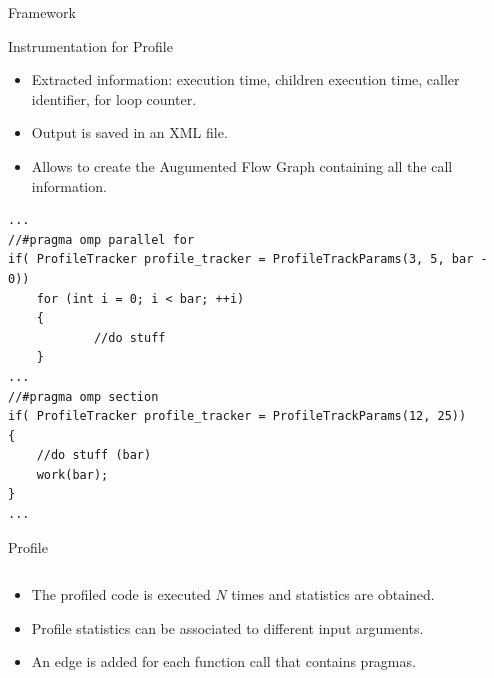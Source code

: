 \documentclass[xcolor=dvipsnames]{beamer}
\begin{document}
\begin{section}{Framework}
\begin{frame}[fragile]{\hskip 0.3cm Instrumentation for Profile}
\begin{itemize}
\item Extracted information: execution time, children execution time, caller identifier, for loop counter.

\item Output is saved in an XML file.

\item Allows to create the Augumented Flow Graph containing all the call information.

\end{itemize}


\begin{lstlisting}[language=CCC]
...
//#pragma omp parallel for
if( ProfileTracker profile_tracker = ProfileTrackParams(3, 5, bar - 0))
	for (int i = 0; i < bar; ++i)
	{
    		//do stuff
	}
...
//#pragma omp section
if( ProfileTracker profile_tracker = ProfileTrackParams(12, 25))
{
    //do stuff (bar)
    work(bar);
}
...
\end{lstlisting}

\end{frame}












\begin{frame}{\hskip 0.3cm Profile}

\begin{columns}

\begin{column}{5cm}
\begin{itemize}

\item The profiled code is executed $N$ times and statistics are obtained. 

\item Profile statistics can be associated to different input arguments.

\item An edge is added for each function call that contains pragmas.

\end{itemize}
\end{column}


\end{columns}
\end{frame}
\end{section}
\end{document}

